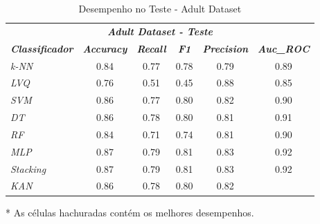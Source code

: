 \documentclass[journal]{IEEEtran}
\begin{document}
\begin{table}[h!]
	\caption{Desempenho no Teste - Adult Dataset}
	\label{tab:10}
	\begin{threeparttable}
		\begin{tabular}{lccccc}
			\hline
			\multicolumn{6}{c}{\textit{\textbf{Adult Dataset - Teste}}}                                                                                                                                          \\
			\multicolumn{1}{l|}{\textit{\textbf{Classificador}}} & \textit{\textbf{Accuracy}} & \textit{\textbf{Recall}}  & \textit{\textbf{F1}}      & \textit{\textbf{Precision}} & \textit{\textbf{Auc\_ROC}} \\ \hline
			\multicolumn{1}{l|}{\textit{k-NN}}                   & 0.84                       & 0.77                      & 0.78                      & 0.79                        & 0.89                       \\
			\multicolumn{1}{l|}{\textit{LVQ}}                    & 0.76                       & 0.51                      & 0.45                      & \cellcolor{lightgray}0.88   & 0.85                       \\
			\multicolumn{1}{l|}{\textit{SVM}}                    & 0.86                       & 0.77                      & 0.80                      & 0.82                        & 0.90                       \\
			\multicolumn{1}{l|}{\textit{DT}}                     & 0.86                       & 0.78                      & 0.80                      & 0.81                        & 0.91                       \\
			\multicolumn{1}{l|}{\textit{RF}}                     & 0.84                       & 0.71                      & 0.74                      & 0.81                        & 0.90                       \\
			\multicolumn{1}{l|}{\textit{MLP}}                    & \cellcolor{lightgray}0.87  & \cellcolor{lightgray}0.79 & \cellcolor{lightgray}0.81 & 0.83                        & \cellcolor{lightgray}0.92  \\
			\multicolumn{1}{l|}{\textit{Stacking}}               & \cellcolor{lightgray}0.87  & \cellcolor{lightgray}0.79 & \cellcolor{lightgray}0.81 & 0.83                        & \cellcolor{lightgray}0.92  \\
			\multicolumn{1}{l|}{\textit{KAN}}                    & 0.86                       & 0.78                      & 0.80                      & 0.82                        &                            \\
			\hline
		\end{tabular}
		\begin{tablenotes}\footnotesize
			\item[*] As células hachuradas contém os melhores desempenhos.
		\end{tablenotes}
	\end{threeparttable}
\end{table}
\end{document}
